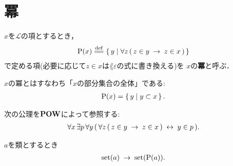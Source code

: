 \section{冪}
	\begin{screen}
		\begin{dfn}[冪]
			$x$を$\mathcal{L}$の項とするとき，
			\begin{align}
				\power{x} \defeq \Set{y}{\forall z\, (\, z \in y \rarrow z \in x\, )}
			\end{align}
			で定める項(必要に応じて$z \in x$は$\lang{\varepsilon}$の式に書き換える)を
			$x$の{\bf 冪}と呼ぶ．
		\end{dfn}
	\end{screen}
	
	$x$の冪とはすなわち「$x$の部分集合の全体」である:
	\begin{align}
		\operatorname*{P} (x) = \left\{\, y \mid y \subset x\, \right\}.
	\end{align}
	
	\begin{screen}
		\begin{axm}[冪の公理]
			次の公理を$\mbox{{\bf POW}}$によって参照する:
			\begin{align}
				\forall x\, \exists p\, \forall y\, 
				(\, \forall z\, (\, z \in y \hspace{0.25em}\rightarrow\hspace{0.25em} z \in x\, ) \hspace{0.25em}\leftrightarrow\hspace{0.25em} y \in p\, ).
			\end{align}
		\end{axm}
	\end{screen}
	
	\begin{screen}
		\begin{thm}[集合の冪は集合]
			$a$を類とするとき
			\begin{align}
				\operatorname*{set} (a) \hspace{0.25em}\rightarrow\hspace{0.25em} \operatorname*{set} (\operatorname*{P} (a)).
			\end{align}
		\end{thm}
	\end{screen}
